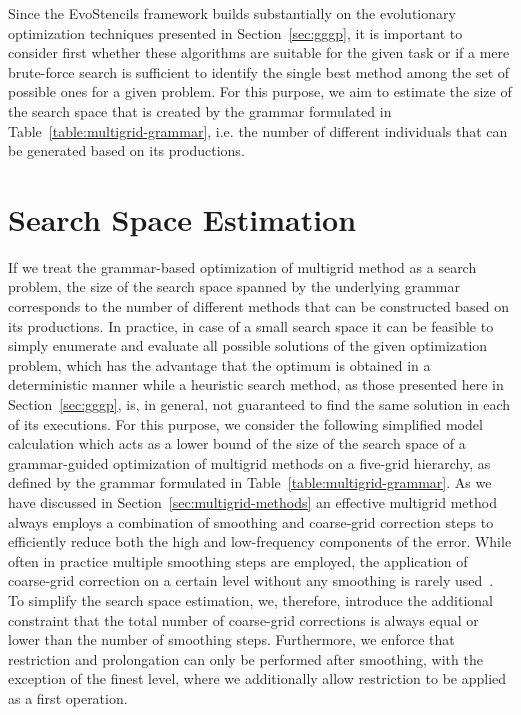 Since the EvoStencils framework builds substantially on the evolutionary optimization techniques presented in Section~\ref{sec:gggp}, it is important to consider first whether these algorithms are suitable for the given task or if a mere brute-force search is sufficient to identify the single best method among the set of possible ones for a given problem.
For this purpose, we aim to estimate the size of the search space that is created by the grammar formulated in Table~\ref{table:multigrid-grammar}, i.e. the number of different individuals that can be generated based on its productions.

\section{Search Space Estimation}
If we treat the grammar-based optimization of multigrid method as a search problem, the size of the search space spanned by the underlying grammar corresponds to the number of different methods that can be constructed based on its productions.
In practice, in case of a small search space it can be feasible to simply enumerate and evaluate all possible solutions of the given optimization problem, which has the advantage that the optimum is obtained in a deterministic manner while a heuristic search method, as those presented here in Section~\ref{sec:gggp}, is, in general, not guaranteed to find the same solution in each of its executions.
For this purpose, we consider the following simplified model calculation which acts as a lower bound of the size of the search space of a grammar-guided optimization of multigrid methods on a five-grid hierarchy, as defined by the grammar formulated in Table~\ref{table:multigrid-grammar}. 
As we have discussed in Section~\ref{sec:multigrid-methods} an effective multigrid method always employs a combination of smoothing and coarse-grid correction steps to efficiently reduce both the high and low-frequency components of the error.
While often in practice multiple smoothing steps are employed, the application of coarse-grid correction on a certain level without any smoothing is rarely used~\cite{trottenberg2000multigrid}.
To simplify the search space estimation, we, therefore, introduce the additional constraint that the total number of coarse-grid corrections is always equal or lower than the number of smoothing steps.
Furthermore, we enforce that restriction and prolongation can only be performed after smoothing, with the exception of the finest level, where we additionally allow restriction to be applied as a first operation.
